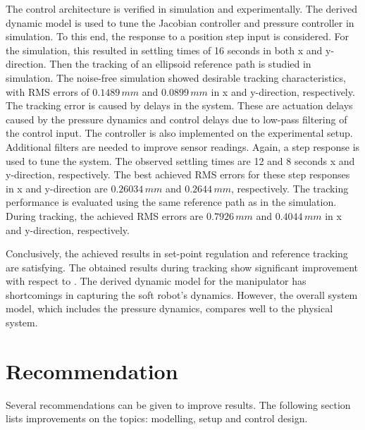 The control architecture is verified in simulation and experimentally. The derived dynamic model is used to tune the Jacobian controller and pressure controller in simulation. To this end, the response to a position step input is considered. For the simulation, this resulted in settling times of 16 seconds in both x and y-direction. Then the tracking of an ellipsoid reference path is studied in simulation. The noise-free simulation showed desirable tracking characteristics, with RMS errors of $0.1489 \hspace{2pt} mm$ and $0.0899 \hspace{2pt} mm$ in x and y-direction, respectively. The tracking error is caused by delays in the system. These are actuation delays caused by the pressure dynamics and control delays due to low-pass filtering of the control input. The controller is also implemented on the experimental setup. Additional filters are needed to improve sensor readings. Again, a step response is used to tune the system. The observed settling times are 12 and 8 seconds x and y-direction, respectively. The best achieved RMS errors for these step responses in x and y-direction are $0.26034 \hspace{2pt} mm$ and $0.2644 \hspace{2pt} mm$, respectively. The tracking performance is evaluated using the same reference path as in the simulation. During tracking, the achieved RMS errors are $0.7926 \hspace{2pt} mm$ and $0.4044 \hspace{2pt}  mm$ in x and y-direction, respectively. 

Conclusively, the achieved results in set-point regulation and reference tracking are satisfying. The obtained results during tracking show significant improvement with respect to \cite{berkers}. The derived dynamic model for the manipulator has shortcomings in capturing the soft robot's dynamics. However, the overall system model, which includes the pressure dynamics, compares well to the physical system. 

\section{Recommendation}

Several recommendations can be given to improve results. The following section lists improvements on the topics: modelling, setup and control design.

